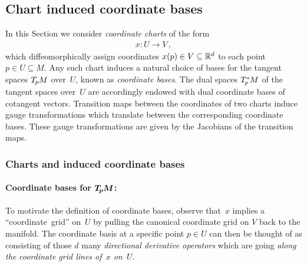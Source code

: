 \subsection{Chart induced coordinate bases}
\label{apx:chart_induced_bases_main}

In this Section we consider \emph{coordinate charts} of the form
\begin{align}
  x: U \to V \,,
\end{align}
which diffeomorphically assign coordinates $x(p) \in V \subseteq \mathbb{R}^d$ to each point $p \in U \subseteq M$.
Any such chart induces a natural choice of bases for the tangent spaces $T_{\mkern-1.5mu p}\mkern-.5muM$ over~$U$, known as \emph{coordinate bases}.
The dual spaces $T_{\mkern-1.5mu p}^{\mkern-0mu *}\mkern-1muM$ of the tangent spaces over~$U$ are accordingly endowed with dual coordinate bases of cotangent vectors.
Transition maps between the coordinates of two charts induce gauge transformations which translate between the corresponding coordinate bases.
These gauge transformations are given by the Jacobians of the transition maps.




\subsubsection{Charts and induced coordinate bases}
\label{apx:coord_basis_def}

\paragraph{Coordinate bases for $\bm{T_{\mkern-1.5mu p}\mkern-.5muM}$:}
To motivate the definition of coordinate bases, observe that~$x$ implies a \mbox{``coordinate grid''} on~$U$ by pulling the canonical coordinate grid on $V$ back to the manifold.
The coordinate basis at a specific point $p \in U$ can then be thought of as consisting of those $d$ many \emph{directional derivative operators} which are going \emph{along the coordinate grid lines of~$x$ on~$U$}.

